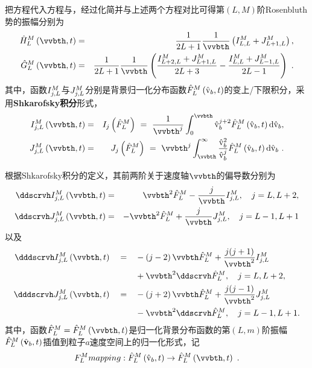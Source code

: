   把方程代入方程与，经过化简并与上述两个方程对比可得第$(L,M)$阶Rosenbluth势的振幅分别为
  \begin{eqnarray}
      \Hhlm \left(\vvbth,t \right) &=& \frac{1}{2 L + 1} \frac{1}{\vvbth} \left (\ILFhlm + \JLpFhlm \right) , \label{HhLM} \\
      \Ghlm \left(\vvbth,t \right) &=& \frac{1}{2 L + 1} \frac{1}{\vvbth} \left (\frac{\ILIIFhlm + \JLpFhlm}{2 L + 3} - \frac{\ILFhlm + \JLnFhlm}{2 L - 1} \right)  ~. \label{GhLM}
  \end{eqnarray}
  其中，函数$I_{j,L}^M$与$J_{j,L}^M$分别是背景归一化分布函数$\hat{F}_L^M\left(\hat{\mathrm{v}}_b,t \right)$的变上/下限积分，采用\textbf{Shkarofsky积分}\cite{Shkarofsky1967,Shkarofsky1997}形式，
  \begin{eqnarray}
      \IjFhlm \left(\vvbth,t \right) &=& I_j\left(\Fhlm \right) \ = \ \frac{1}{\vvbth^j} \int_0^{\vvbth} \rmvhb^{j+2} \Fhlm \left( \rmvhb,t \right) \rmd \rmvhb, \label{IjFLM} \\ 
      \JjFhlm \left(\vvbth,t \right) &=& J_j\left(\Fhlm \right) \ = \ \vvbth^j \int_{\vvbth}^{\infty} \frac{\rmvhb^2}{\rmvhb^j} \Fhlm \left( \rmvhb,t \right) \rmd \rmvhb ~. \label{JjFLM}
  \end{eqnarray}
  
  根据Shkarofsky积分的定义，其前两阶关于速度轴$\vvbth$的偏导数分别为
  \begin{eqnarray}
      \ddscrvh \IjFhlm \left(\vvbth,t \right) &=&  \vvbth^2 \Fhlm - \frac{j}{\vvbth} \IjFhlm, \quad j = L,L+2, \label{dIjFLM} \\
      \ddscrvh \JjFhlm \left(\vvbth,t \right) &=&  - \vvbth^2 \Fhlm + \frac{j}{\vvbth} \JjFhlm, \quad j = L-1,L+1 \label{dJjFLM}
  \end{eqnarray}
  以及
  \begin{eqnarray}
  \begin{aligned}
      \dddscrvh \IjFhlm \left(\vvbth,t \right) \quad = \quad & - \left(j-2 \right)  \vvbth \Fhlm + \frac{j(j+1)}{\vvbth^2} \IjFhlm 
      \\ & + \vvbth^2 \ddscrvh \Fhlm, \quad j = L,L+2, \label{ddIjFLM} \\
      \dddscrvh \JjFhlm \left(\vvbth,t \right) \quad = \quad & - \left(j+2 \right) \vvbth \Fhlm + \frac{j (j-1)}{\vvbth^2} \JjFhlm 
      \\ & - \vvbth^2 \ddscrvh \Fhlm, \quad j = L-1,L+1 . \label{ddJjFLM}
  \end{aligned}
  \end{eqnarray}
  其中，函数$\Fhlm=\Fhlm\left(\vvbth,t \right)$是归一化背景分布函数的第$(L,m)$阶振幅$\hat{F}_L^M \left(\hat{\mathbf{v}}_b,t \right)$插值到粒子$a$速度空间上的归一化形式，记
  \begin{eqnarray}
      F_L^M mapping:\Fhlm \left(\rmvhb,t \right) \to \Fhlm \left(\vvbth,t \right)
      ~. \label{FLMmapping}          
  \end{eqnarray}
  
